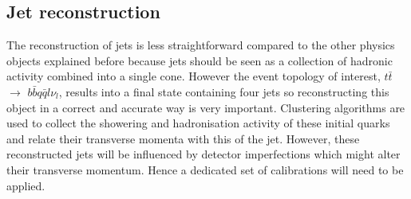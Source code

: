 \subsection{Jet reconstruction}\label{subsec::jetReco}
The reconstruction of jets is less straightforward compared to the other physics objects explained before because jets should be seen as a collection of hadronic activity combined into a single cone. However the event topology of interest, $t\bar{t}$ $\rightarrow$ $b\bar{b}q\bar{q}l\nu_{l}$, results into a final state containing four jets so reconstructing this object in a correct and accurate way is very important.
Clustering algorithms are used to collect the showering and hadronisation activity of these initial quarks and relate their transverse momenta with this of the jet.
However, these reconstructed jets will be influenced by detector imperfections which might alter their transverse momentum. Hence a dedicated set of calibrations will need to be applied.

